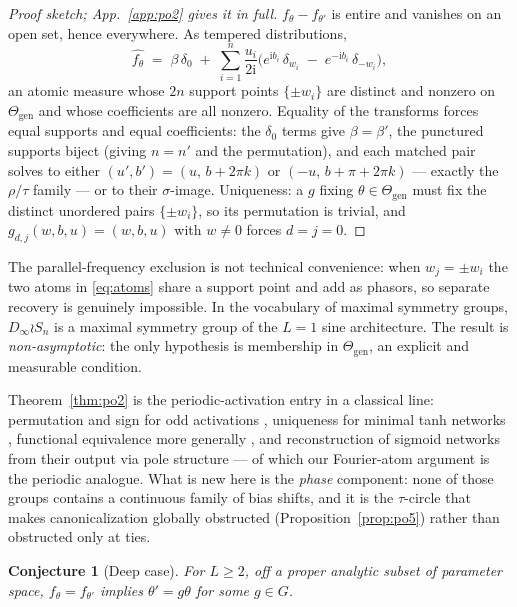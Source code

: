 \documentclass[10pt,letterpaper]{article}
\newtheorem{conjecture}[theorem]{Conjecture}
\theoremstyle{definition}
\newcommand{\Dinf}{D_\infty}
\newcommand{\Thgen}{\Theta_{\mathrm{gen}}}
\begin{document}
\begin{proof}[Proof sketch; App.~\ref{app:po2} gives it in full]
$f_\theta - f_{\theta'}$ is entire and vanishes on an open set, hence everywhere. As tempered
distributions,
\begin{equation}
\widehat{f_\theta} \;=\; \beta\,\delta_0 \;+\; \sum_{i=1}^{n} \frac{u_i}{2\mathrm i}
\Big( e^{\mathrm i b_i}\,\delta_{w_i} \;-\; e^{-\mathrm i b_i}\,\delta_{-w_i} \Big),
\label{eq:atoms}
\end{equation}
an atomic measure whose $2n$ support points $\{\pm w_i\}$ are distinct and nonzero on $\Thgen$
and whose coefficients are all nonzero. Equality of the transforms forces equal supports and
equal coefficients: the $\delta_0$ terms give $\beta=\beta'$, the punctured supports biject
(giving $n=n'$ and the permutation), and each matched pair solves to either
$(u',b') = (u,\, b+2\pi k)$ or $(-u,\, b+\pi+2\pi k)$ --- exactly the $\rho/\tau$ family --- or
to their $\sigma$-image. Uniqueness: a $g$ fixing $\theta \in \Thgen$ must fix the distinct
unordered pairs $\{\pm w_i\}$, so its permutation is trivial, and $g_{d,j}(w,b,u)=(w,b,u)$ with
$w\neq0$ forces $d=j=0$.
\end{proof}

The parallel-frequency exclusion is not technical convenience: when $w_j = \pm w_i$ the two atoms
in \eqref{eq:atoms} share a support point and add as phasors, so separate recovery is genuinely
impossible. In the vocabulary of maximal symmetry groups, $\Dinf\wr S_n$ is a maximal symmetry
group of the $L=1$ sine architecture. The result is \emph{non-asymptotic}: the only hypothesis is
membership in $\Thgen$, an explicit and measurable condition.

Theorem~\ref{thm:po2} is the periodic-activation entry in a classical line: permutation and sign
for odd activations \citep{hechtnielsen1990algebraic}, uniqueness for minimal tanh networks
\citep{sussmann1992uniqueness}, functional equivalence more generally
\citep{kurkova1994functionally}, and reconstruction of sigmoid networks from their output via pole
structure \citep{fefferman1994reconstructing} --- of which our Fourier-atom argument is the
periodic analogue. What is new here is the \emph{phase} component: none of those groups contains a
continuous family of bias shifts, and it is the $\tau$-circle that makes canonicalization globally
obstructed (Proposition~\ref{prop:po5}) rather than obstructed only at ties.

\begin{conjecture}[Deep case]\label{conj:deep}
For $L\ge2$, off a proper analytic subset of parameter space, $f_\theta = f_{\theta'}$ implies
$\theta' = g\theta$ for some $g\in G$.
\end{conjecture}
\end{document}
